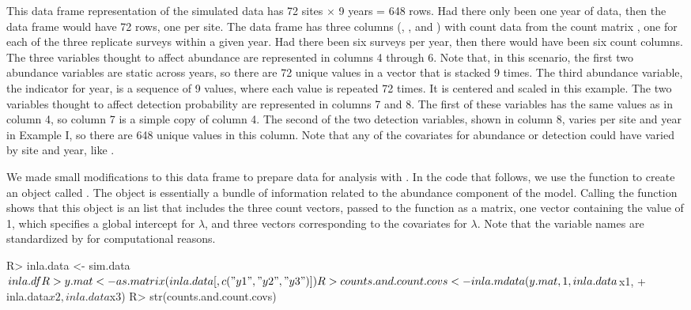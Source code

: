 \documentclass[codesnippet]{jss}
\begin{document}
This data frame representation of the simulated data has 72 sites $\times$ 9 years = 648 rows. Had there only been one year of data, then the data frame would have 72 rows, one per site. The data frame has three columns (, , and ) with count data from the count matrix , one for each of the three replicate surveys within a given year. Had there been six surveys per year, then there would have been six count columns. The three variables thought to affect abundance are represented in columns 4 through 6. Note that, in this scenario, the first two abundance variables are static across years, so there are 72 unique values in a vector that is stacked 9 times. The third abundance variable, the indicator for year, is a sequence of 9 values, where each value is repeated 72 times. It is centered and scaled in this example. The two variables thought to affect detection probability are represented in columns 7 and 8. The first of these variables has the same values as in column 4, so column 7 is a simple copy of column 4. The second of the two detection variables, shown in column 8, varies per site and year in Example I, so there are 648 unique values in this column. Note that any of the covariates for abundance or detection could have varied by site and year, like .

We made small modifications to this data frame to prepare data for analysis with . In the code that follows, we use the  function to create an object called . The  object is essentially a bundle of information related to the abundance component of the model.  Calling the  function shows that this object is an  list that includes the three count vectors, passed to the function as a matrix, one vector containing the value of 1, which specifies a global intercept for $\lambda$, and three vectors corresponding to the covariates for $\lambda$. Note that the variable names are standardized by  for computational reasons. 

\begin{CodeInput}
R> inla.data <- sim.data$inla.df
R> y.mat <- as.matrix(inla.data[,c("y1", "y2", "y3")])
R> counts.and.count.covs <- inla.mdata(y.mat, 1, inla.data$x1, 
+    inla.data$x2, inla.data$x3)
R> str(counts.and.count.covs)
\end{CodeInput}
\end{document}
